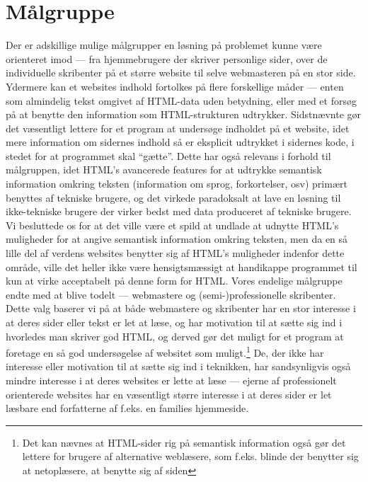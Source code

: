 \documentclass[a4paper,oneside,article]{memoir}
\begin{document}
\section{Målgruppe}
\label{målgruppe}
Der er adskillige mulige målgrupper en løsning på problemet kunne være
orienteret imod --- fra hjemmebrugere der skriver personlige sider,
over de individuelle skribenter på et større website til selve
webmasteren på en stor side. Ydermere kan et websites indhold
fortolkes på flere forskellige måder --- enten som almindelig tekst
omgivet af HTML-data uden betydning, eller med et forsøg på at benytte
den information som HTML-strukturen udtrykker. Sidstnævnte gør det
væsentligt lettere for et program at undersøge indholdet på et
website, idet mere information om sidernes indhold så er eksplicit
udtrykket i sidernes kode, i stedet for at programmet skal
``gætte''. Dette har også relevans i forhold til målgruppen, idet
HTML's avancerede features for at udtrykke semantisk information
omkring teksten (information om sprog, forkortelser, osv) primært
benyttes af tekniske brugere, og det virkede paradoksalt at lave en
løsning til ikke-tekniske brugere der virker bedst med data produceret
af tekniske brugere. Vi besluttede os for at det ville være et spild
at undlade at udnytte HTML's muligheder for at angive semantisk
information omkring teksten, men da en så lille del af verdens
websites benytter sig af HTML's muligheder indenfor dette område,
ville det heller ikke være hensigtsmæssigt at handikappe programmet
til kun at virke acceptabelt på denne form for HTML. Vores endelige
målgruppe endte med at blive todelt --- webmastere og
(semi-)professionelle skribenter. Dette valg baserer vi på at både
webmastere og skribenter har en stor interesse i at deres sider eller
tekst er let at læse, og har motivation til at sætte sig ind i
hvorledes man skriver god HTML, og derved gør det muligt for et
program at foretage en så god undersøgelse af websitet som
muligt.\footnote{Det kan nævnes at HTML-sider rig på semantisk
  information også gør det lettere for brugere af alternative
  weblæsere, som f.eks. blinde der benytter sig at netoplæsere, at
  benytte sig af siden} De, der ikke har interesse eller motivation
til at sætte sig ind i teknikken, har sandsynligvis også mindre
interesse i at deres websites er lette at læse --- ejerne af
professionelt orienterede websites har en væsentligt større interesse
i at deres sider er let læsbare end forfatterne af f.eks. en families
hjemmeside.
\end{document}
